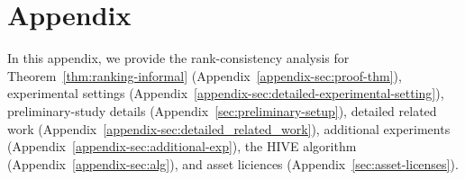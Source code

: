\clearpage
\appendix
\section*{Appendix}
In this appendix, we provide the rank-consistency analysis for Theorem~\ref{thm:ranking-informal} (Appendix~\ref{appendix-sec:proof-thm}), experimental settings (Appendix~\ref{appendix-sec:detailed-experimental-setting}), preliminary-study details (Appendix~\ref{sec:preliminary-setup}), detailed related work (Appendix~\ref{appendix-sec:detailed_related_work}), additional experiments (Appendix~\ref{appendix-sec:additional-exp}), the HIVE algorithm (Appendix~\ref{appendix-sec:alg}), and asset liciences (Appendix~\ref{sec:asset-licenses}).







